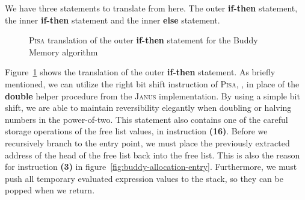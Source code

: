 We have three statements to translate from here. The outer \textbf{if-then} statement, the inner \textbf{if-then} statement and the inner \textbf{else} statement. 

\begin{figure}[ht!]
    \centering
    \begin{subfigure}{.4\textwidth}
          
    \end{subfigure}
    \begin{subfigure}{.4\textwidth}
        \centering
    \end{subfigure}
    \caption{\textsc{Pisa} translation of the outer \textbf{if-then} statement for the Buddy Memory algorithm}
    \label{fig:pisa-buddy-outer-if}
\end{figure}

Figure~\ref{fig:pisa-buddy-outer-if} shows the translation of the outer \textbf{if-then} statement. As briefly mentioned, we can utilize the right bit shift instruction of \textsc{Pisa}, , in place of the \textbf{double} helper procedure from the \textsc{Janus} implementation. By using a simple bit shift, we are able to maintain reversibility elegantly when doubling or halving numbers in the power-of-two. This statement also contains one of the careful storage operations of the free list values, in instruction \textbf{(16)}. Before we recursively branch to the entry point, we must place the previously extracted address of the head of the free list back into the free list. This is also the reason for instruction \textbf{(3)} in figure~\ref{fig:buddy-allocation-entry}. Furthermore, we must push all temporary evaluated expression values to the stack, so they can be popped when we return.   

